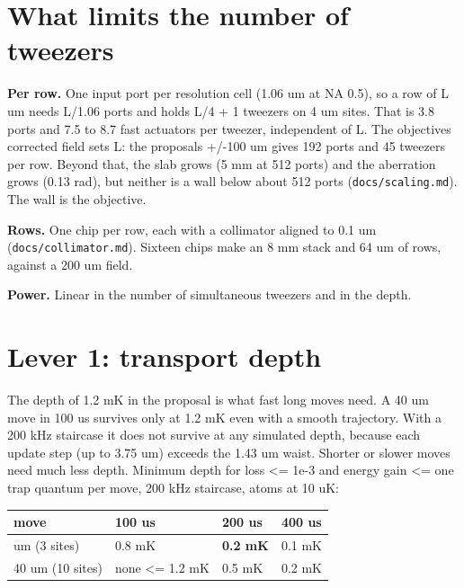 \hypertarget{2-what-limits-the-number-of-tweezers}{%
\section{What limits the number of
tweezers}\label{scaling_beyond-2-what-limits-the-number-of-tweezers}}

\textbf{Per row.} One input port per resolution cell (1.06 um at NA
0.5), so a row of L um needs L/1.06 ports and holds L/4 + 1 tweezers on
4 um sites. That is 3.8 ports and 7.5 to 8.7 fast actuators per tweezer,
independent of L. The objective\textquotesingle s corrected field sets
L: the proposal\textquotesingle s +/-100 um gives 192 ports and 45
tweezers per row. Beyond that, the slab grows (5 mm at 512 ports) and
the aberration grows (0.13 rad), but neither is a wall below about 512
ports (\texttt{docs/scaling.md}). The wall is the objective.

\textbf{Rows.} One chip per row, each with a collimator aligned to 0.1
um (\texttt{docs/collimator.md}). Sixteen chips make an 8 mm stack and
64 um of rows, against a 200 um field.

\textbf{Power.} Linear in the number of simultaneous tweezers and in the
depth.

\hypertarget{3-lever-1-transport-depth}{%
\section{Lever 1: transport depth}\label{scaling_beyond-3-lever-1-transport-depth}}

The depth of 1.2 mK in the proposal is what fast long moves need. A 40
um move in 100 us survives only at 1.2 mK even with a smooth trajectory.
With a 200 kHz staircase it does not survive at any simulated depth,
because each update step (up to 3.75 um) exceeds the 1.43 um waist.
Shorter or slower moves need much less depth. Minimum depth for loss
\textless= 1e-3 and energy gain \textless= one trap quantum per move,
200 kHz staircase, atoms at 10 uK:

{\small
\begin{longtable}[]{@{}llll@{}}
\toprule\noalign{}
move & 100 us & 200 us & 400 us \\
\midrule\noalign{}
\endhead
\bottomrule\noalign{}
\endlastfoot
12 um (3 sites) & 0.8 mK & \textbf{0.2 mK} & 0.1 mK \\
40 um (10 sites) & none \textless= 1.2 mK & 0.5 mK & 0.2 mK \\
\end{longtable}
}

